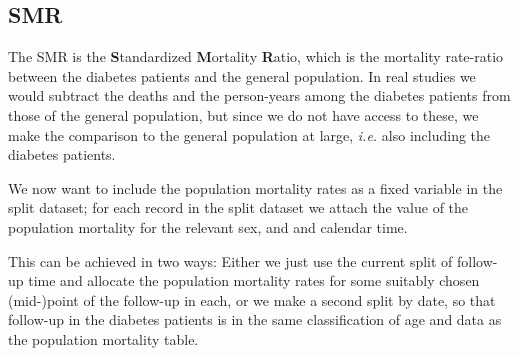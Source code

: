 \subsection*{SMR}




The SMR is the \textbf{S}tandardized \textbf{M}ortality
\textbf{R}atio, which is the mortality rate-ratio between the diabetes
patients and the general population.  In real studies we would
subtract the deaths and the person-years among the diabetes patients
from those of the general population, but since we do not have access
to these, we make the comparison to the general population at large,
\textit{i.e.} also including the diabetes patients.

We now want to include the population mortality rates as a fixed
variable in the split dataset; for each record in the split dataset we
attach the value of the population mortality for the relevant sex, and
and calendar time.

This can be achieved in two ways: Either we just use the current split
of follow-up time and allocate the population mortality rates for some
suitably chosen (mid-)point of the follow-up in each, or we make a
second split by date, so that follow-up in the diabetes patients is in
the same classification of age and data as the population mortality
table.

